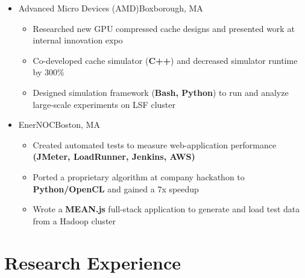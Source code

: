 \documentclass[11pt,letterpaper,sans]{moderncv}
\begin{document}
\begin{itemize}
\item[] {
{Advanced Micro Devices (AMD)}{Boxborough, MA}{}{\vspace{1pt}}
\vspace{-9pt}	\begin{itemize}
	 \item Researched new GPU compressed cache designs and presented work at internal innovation expo
	 \item Co-developed cache simulator (\textbf{C++}) and decreased simulator runtime by 300\%
	 \item Designed simulation framework (\textbf{Bash, Python}) to run and analyze large-scale experiments on LSF cluster
	\end{itemize}
}
\vspace{4pt}

\item[] {
{EnerNOC}{Boston, MA}{}{\vspace{1pt}}
\vspace{-9pt}	\begin{itemize}
	 \item Created automated tests to measure web-application performance \textbf{(JMeter, LoadRunner, Jenkins, AWS)}
	 \item Ported a proprietary algorithm at company hackathon to \textbf{Python/OpenCL} and gained a 7x speedup
	 \item Wrote a \textbf{MEAN.js} full-stack application to generate and load test data from a Hadoop cluster
	\end{itemize}
}


\end{itemize}
\vspace{-8pt}



\section{Research Experience}
\end{document}
